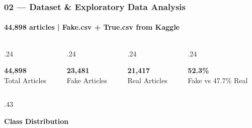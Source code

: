 \documentclass[aspectratio=169,10pt]{beamer}
\begin{document}
\begin{frame}[t]
\frametitle{02 --- Dataset \& Exploratory Data Analysis}
\framesubtitle{44,898 articles | Fake.csv + True.csv from Kaggle}
\vspace{-0.5cm}
\begin{columns}[T]
\begin{column}{.24\textwidth}
  \begin{tcolorbox}[statbox={BlueL},colframe=ABlue]
    {\large\bfseries\color{Navy}44,898}\\[2pt]{\tiny\color{Navy}Total Articles}
  \end{tcolorbox}
\end{column}
\begin{column}{.24\textwidth}
  \begin{tcolorbox}[statbox={RedL},colframe=ARed]
    {\large\bfseries\color{ARed}23,481}\\[2pt]{\tiny\color{ARed}Fake Articles}
  \end{tcolorbox}
\end{column}
\begin{column}{.24\textwidth}
  \begin{tcolorbox}[statbox={GreenL},colframe=AGreen]
    {\large\bfseries\color{AGreen}21,417}\\[2pt]{\tiny\color{AGreen}Real Articles}
  \end{tcolorbox}
\end{column}
\begin{column}{.24\textwidth}
  \begin{tcolorbox}[statbox={OrangeL},colframe=AOrange]
    {\large\bfseries\color{AOrange}52.3\%}\\[2pt]{\tiny\color{AOrange}Fake vs 47.7\% Real}
  \end{tcolorbox}
\end{column}
\end{columns}
\vspace{.1cm}
\begin{columns}[T]
\begin{column}{.43\textwidth}
  \begin{tcolorbox}[mycard={BlueMid}{ABlue}]
    {\footnotesize\textbf{Class Distribution}}\\[4pt]
    \centering
\end{tcolorbox}
\end{column}
\end{columns}
\end{frame}
\end{document}
